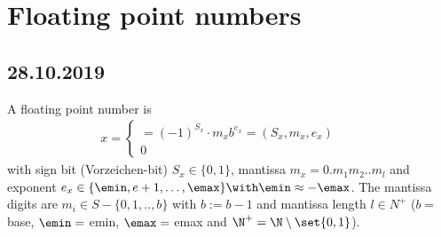 \section{Floating point numbers}
\subsection*{28.10.2019}
A floating point number is 
\begin{align*}
	x = \begin{cases}
	= (-1)^{S_x}\cdot m_xb^{e_x}=(S_x,m_x,e_x) &\quad \\
	0 \quad
	\end{cases}
\end{align*}
with sign bit (Vorzeichen-bit) $S_x\in \{0,1\}$, mantissa $m_x=0.m_1m_2..m_l$ and exponent $e_x\in \{\emin,e+1,\dots,\emax\} \with \emin \approx -\emax$. The mantissa digits are $m_i\in S-\{0,1,..,b\}$ with $b:=b-1$ and mantissa length $l\in N^+$ ($b =$ base, $\emin =$ emin, $\emax =$ emax and $\N^+ = \N\setminus \set{0,1}$).
